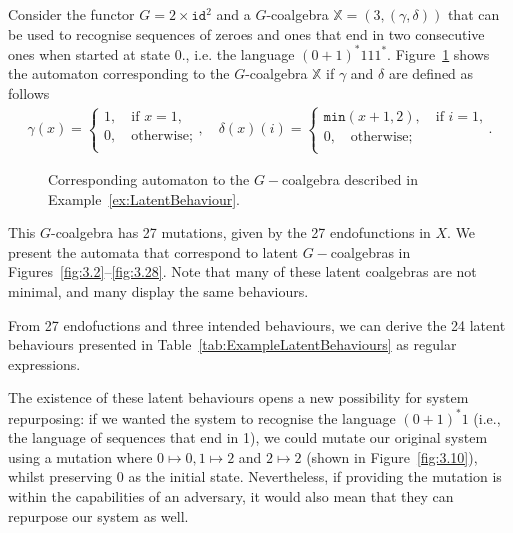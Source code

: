 \begin{example}
\label{ex:LatentBehaviour}
Consider the functor $G=2\times \texttt{id}^2$ and a $G$-coalgebra $\mathbb{X}=(3,(\gamma,\delta))$ that can be used to recognise sequences of zeroes and ones that end in two consecutive ones when started at state 0., i.e. the language $(0+1)^*111^*$. Figure~\ref{fig:ExampleLatent} shows the automaton corresponding to the $G$-coalgebra $\mathbb{X}$ if $\gamma$ and $\delta$ are defined as follows
\begin{align}
\gamma(x)=\begin{cases}
1, \quad \text{if  $x=1$,}\\
0, \quad \text{otherwise;}\\
\end{cases},\quad
\delta(x)(i)=\begin{cases}
\texttt{min}(x+1,2), \quad \text{if  $i=1$,}\\
0, \quad \text{otherwise;}\\
\end{cases}.
\end{align}

\begin{figure}[t]
\centering
{}
\caption{Corresponding automaton to the $G-$coalgebra described in Example~\ref{ex:LatentBehaviour}.}
\label{fig:ExampleLatent}
\end{figure}

This $G$-coalgebra has 27 mutations, given by the 27 endofunctions in $X$. We present the automata that correspond to latent $G-$coalgebras in Figures~\ref{fig:3.2}--\ref{fig:3.28}. Note that many of these latent coalgebras are not minimal, and many display the same behaviours.

From 27 endofuctions and three intended behaviours, we can derive the 24 latent behaviours presented in Table~\ref{tab:ExampleLatentBehaviours} as regular expressions. 

The existence of these latent behaviours opens a new possibility for system repurposing: if we wanted the system to recognise the language $(0+1)^*1$ (i.e., the language of sequences that end in 1), we could mutate our original system using a mutation where $0\mapsto0, 1\mapsto2$ and $2\mapsto2$ (shown in Figure~\ref{fig:3.10}), whilst preserving $0$ as the initial state. Nevertheless, if providing the mutation is within the capabilities of an adversary, it would also mean that they can repurpose our system as well. 


\end{example}
